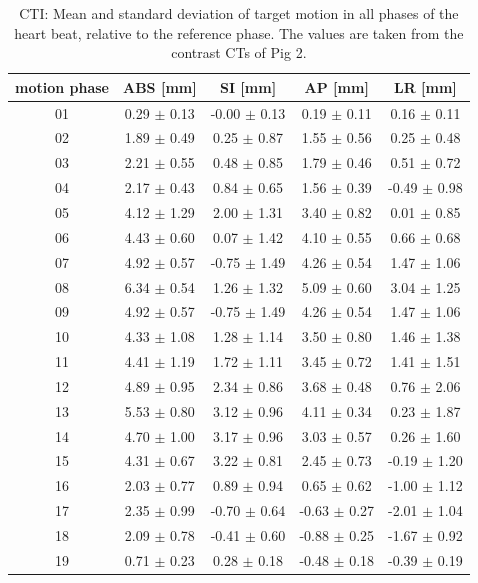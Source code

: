 \documentclass[type=dr, dr=rernat, accentcolor=tud7b,colorbacktitle, bigchapter, openright, twoside, 12pt ]{tudthesis}
\begin{document}
\newpage

\begin{table}[htbp]
  \centering
  \caption{CTI: Mean and standard deviation of target motion in all phases of the heart beat, relative to the reference phase. The values are 
  taken from the contrast CTs of Pig 2.}
  \begin{tabular}{|c|c|c|c|c|}
    \hline\hline
    motion phase\rule{0pt}{2.6ex}\rule[-1.2ex]{0pt}{0pt} & ABS [mm] & SI [mm] & AP [mm] & LR [mm]\\
    \hline
01 &0.29 $\pm$ 0.13 &-0.00 $\pm$ 0.13 &0.19 $\pm$ 0.11 &0.16 $\pm$ 0.11 \\
02 &1.89 $\pm$ 0.49 &0.25 $\pm$ 0.87 &1.55 $\pm$ 0.56 &0.25 $\pm$ 0.48 \\
03 &2.21 $\pm$ 0.55 &0.48 $\pm$ 0.85 &1.79 $\pm$ 0.46 &0.51 $\pm$ 0.72 \\
04 &2.17 $\pm$ 0.43 &0.84 $\pm$ 0.65 &1.56 $\pm$ 0.39 &-0.49 $\pm$ 0.98 \\
05 &4.12 $\pm$ 1.29 &2.00 $\pm$ 1.31 &3.40 $\pm$ 0.82 &0.01 $\pm$ 0.85 \\
06 &4.43 $\pm$ 0.60 &0.07 $\pm$ 1.42 &4.10 $\pm$ 0.55 &0.66 $\pm$ 0.68 \\
07 &4.92 $\pm$ 0.57 &-0.75 $\pm$ 1.49 &4.26 $\pm$ 0.54 &1.47 $\pm$ 1.06 \\
08 &6.34 $\pm$ 0.54 &1.26 $\pm$ 1.32 &5.09 $\pm$ 0.60 &3.04 $\pm$ 1.25 \\
09 &4.92 $\pm$ 0.57 &-0.75 $\pm$ 1.49 &4.26 $\pm$ 0.54 &1.47 $\pm$ 1.06 \\
10 &4.33 $\pm$ 1.08 &1.28 $\pm$ 1.14 &3.50 $\pm$ 0.80 &1.46 $\pm$ 1.38 \\
11 &4.41 $\pm$ 1.19 &1.72 $\pm$ 1.11 &3.45 $\pm$ 0.72 &1.41 $\pm$ 1.51 \\
12 &4.89 $\pm$ 0.95 &2.34 $\pm$ 0.86 &3.68 $\pm$ 0.48 &0.76 $\pm$ 2.06 \\
13 &5.53 $\pm$ 0.80 &3.12 $\pm$ 0.96 &4.11 $\pm$ 0.34 &0.23 $\pm$ 1.87 \\
14 &4.70 $\pm$ 1.00 &3.17 $\pm$ 0.96 &3.03 $\pm$ 0.57 &0.26 $\pm$ 1.60 \\
15 &4.31 $\pm$ 0.67 &3.22 $\pm$ 0.81 &2.45 $\pm$ 0.73 &-0.19 $\pm$ 1.20 \\
16 &2.03 $\pm$ 0.77 &0.89 $\pm$ 0.94 &0.65 $\pm$ 0.62 &-1.00 $\pm$ 1.12 \\
17 &2.35 $\pm$ 0.99 &-0.70 $\pm$ 0.64 &-0.63 $\pm$ 0.27 &-2.01 $\pm$ 1.04 \\
18 &2.09 $\pm$ 0.78 &-0.41 $\pm$ 0.60 &-0.88 $\pm$ 0.25 &-1.67 $\pm$ 0.92 \\
19 &0.71 $\pm$ 0.23 &0.28 $\pm$ 0.18 &-0.48 $\pm$ 0.18 &-0.39 $\pm$ 0.19 \\
    \hline\hline
  \end{tabular}
  \label{tab:motion:CTI:Pig2}
\end{table}
\end{document}
